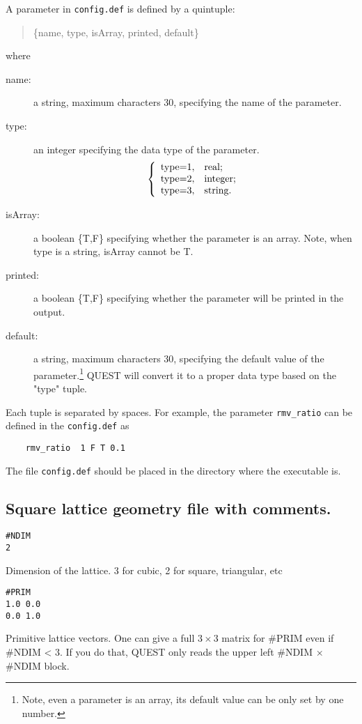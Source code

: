 \documentclass[12pt]{article}
\begin{document}
A parameter in \verb"config.def" is defined by a quintuple:
\begin{quote}
    \{name, type, isArray, printed, default\}
\end{quote}
where
\begin{description}
  \item[name:] a string, maximum characters 30, specifying the name of the parameter.
  \item[type:] an integer specifying the data type of the parameter.
  $$
  \left\{
    \begin{array}{ll}
      \hbox{type=1}, & \hbox{real;} \\
      \hbox{type=2}, & \hbox{integer;} \\
      \hbox{type=3}, & \hbox{string.}
    \end{array}
  \right.
  $$
  \item[isArray:] a boolean \{T,F\} specifying whether the parameter is an array.
  Note, when type is a string, isArray cannot be T.
  \item[printed:] a boolean \{T,F\} specifying whether the parameter will be printed in the output.
  \item[default:] a string, maximum characters 30,  specifying the default value of the parameter.\footnote{Note, even a parameter is an array, its default value can be only set by one number.}  QUEST will convert it to a proper data type based on the "type" tuple.
\end{description}
Each tuple is separated by spaces.
For example, the parameter \verb"rmv_ratio" can be defined in the \verb"config.def" as
\begin{verbatim}
    rmv_ratio  1 F T 0.1
\end{verbatim}

The file \verb"config.def" should be placed in the directory where the executable is.


\subsection{Square lattice geometry file with comments.}
\begin{verbatim}
#NDIM
2
\end{verbatim}
Dimension of the lattice. 3 for cubic, 2 for square, triangular, etc

\begin{verbatim}
#PRIM
1.0 0.0
0.0 1.0
\end{verbatim}
Primitive lattice vectors.  One can give a full $3 \times 3$ matrix for \#PRIM even if \#NDIM < 3. If you do that, QUEST only reads the upper left \#NDIM $\times$ \#NDIM block.
\end{document}
